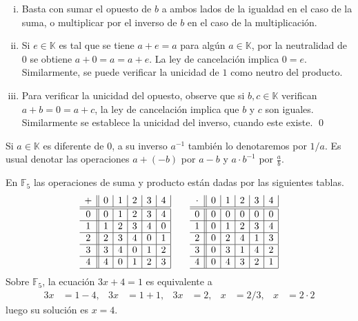 \dem
\begin{enumerate}[(i)]
  \item Basta con sumar el opuesto de $b$ a ambos lados de la igualdad en el caso de la suma, o multiplicar por el inverso de $b$ en el caso de la multiplicación.
  \item Si $e\in \mathbb{K}$ es tal que se tiene $a+e=a$ para algún $a\in \mathbb{K}$, por la neutralidad de $0$ se obtiene $a+0=a=a+e$. La ley de cancelación implica $0=e$. Similarmente, se puede verificar la unicidad de $1$ como neutro del producto.
  \item Para verificar la unicidad del opuesto, observe que si $b,c\in \mathbb{K}$ verifican $a+b=0=a+c$, la ley de cancelación implica que $b$ y $c$ son iguales. Similarmente se establece la unicidad del inverso, cuando este existe. \qed
\end{enumerate}

\begin{nota}
Si $a\in \mathbb{K}$ es diferente de $0$, a su inverso $a^{-1}$ también lo denotaremos por $1/a$. Es usual denotar las operaciones $a+(-b)$ por $a-b$ y $a\cdot b^{-1}$ por $\frac{a}{b}$.
\end{nota}

\begin{ejem}
  En $\mathbb{F}_5$ las operaciones de suma y producto están dadas por las siguientes tablas.
  {\small
    $$\begin{array}{c||c|c|c|c|c|}
    + & 0 & 1 & 2 & 3 & 4\\
    \hline
    \hline
    0 & 0 & 1 & 2 & 3 & 4\\
    \hline
    1 & 1 & 2 & 3 & 4 & 0\\
    \hline 
    2 & 2 & 3 & 4 & 0 & 1\\
    \hline 
    3 & 3 & 4 & 0 & 1 & 2\\
    \hline 
    4 & 4 & 0 & 1 & 2 & 3\\
    \hline 
    \end{array} \qquad
    \begin{array}{c||c|c|c|c|c|}
    \cdot & 0 & 1 & 2 & 3 & 4\\
    \hline
    \hline
    0 & 0 & 0 & 0 & 0 & 0\\
    \hline
    1 & 0 & 1 & 2 & 3 & 4\\
    \hline 
    2 & 0 & 2 & 4 & 1 & 3\\
    \hline 
    3 & 0 & 3 & 1 & 4 & 2\\
    \hline 
    4 & 0 & 4 & 3 & 2 & 1\\
    \hline 
    \end{array}
  $$
  }
  Sobre $\mathbb{F}_5$, la ecuación $3x+4=1$ es equivalente a
    \begin{align*}
    3x & = 1-4, & 3x & = 1+1, & 3x & = 2, & x & = 2/3, & x & = 2\cdot 2
    \end{align*}
  luego su solución es $x=4$.
  \end{ejem}

